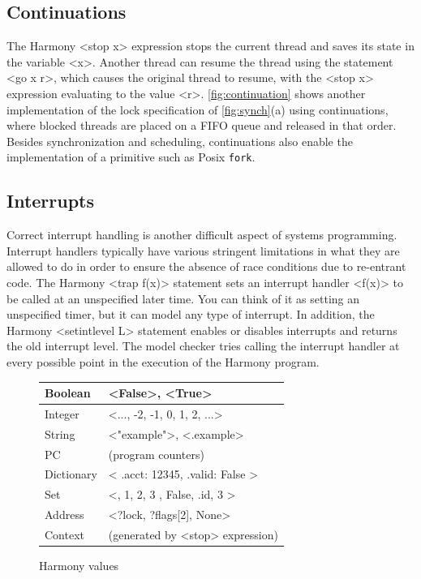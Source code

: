 \documentclass[twocolumn]{article}
\begin{document}
\subsection{Continuations}

The Harmony <{stop x}> expression stops the current thread and saves
its state in the variable <{x}>.  Another thread can resume the
thread using the statement <{go x r}>, which causes the original
thread to resume, with the <{stop x}> expression evaluating to the
value <{r}>.  \autoref{fig:continuation} shows another implementation
of the lock specification of \autoref{fig:synch}(a) using continuations,
where blocked threads are placed on a FIFO queue and released in
that order.  Besides synchronization and scheduling, continuations
also enable the implementation of a primitive such as Posix
\texttt{fork}.

\subsection{Interrupts}

Correct interrupt handling is another difficult aspect of
systems programming.  Interrupt handlers typically have various
stringent limitations in what they are allowed to do in order
to ensure the absence of race conditions due to re-entrant code.
The Harmony <{trap f(x)}> statement sets an interrupt handler
<{f(x)}> to be called at an unspecified later time.  You can think
of it as setting an unspecified timer, but it can model any type
of interrupt.  In addition, the Harmony <{setintlevel L}> statement
enables or disables interrupts and returns the old interrupt level.
The model checker tries calling the interrupt handler at every
possible point in the execution of the Harmony program.

\begin{figure}
\begin{tabular}{|l|l|}
\hline
Boolean & <{False}>, <{True}> \\
\hline
Integer & <{..., -2, -1, 0, 1, 2, ...}> \\
\hline
String & <{"example"}>, <{.example}> \\
\hline
PC & (program counters) \\
\hline
Dictionary & <{{ .acct: 12345, .valid: False }}> \\
\hline
Set & <{{}, { 1, 2, 3 }, { False, .id, 3 }}> \\
\hline
Address & <{?lock, ?flags[2], None}> \\
\hline
Context & (generated by <{stop}> expression) \\
\hline
\end{tabular}
\caption{Harmony values}
\label{fig:values}
\end{figure}
\end{document}
